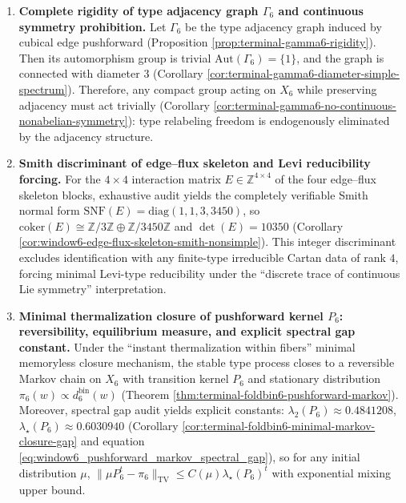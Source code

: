 \begin{enumerate}
  \item \textbf{Complete rigidity of type adjacency graph \texorpdfstring{$\Gamma_6$}{Gamma6} and continuous symmetry prohibition.}
  Let \(\Gamma_6\) be the type adjacency graph induced by cubical edge pushforward (Proposition \ref{prop:terminal-gamma6-rigidity}).
  Then its automorphism group is trivial \(\mathrm{Aut}(\Gamma_6)=\{1\}\), and the graph is connected with diameter \(3\) (Corollary \ref{cor:terminal-gamma6-diameter-simple-spectrum}).
  Therefore, any compact group acting on \(X_6\) while preserving adjacency must act trivially (Corollary \ref{cor:terminal-gamma6-no-continuous-nonabelian-symmetry}): type relabeling freedom is endogenously eliminated by the adjacency structure.

  \item \textbf{Smith discriminant of edge--flux skeleton and Levi reducibility forcing.}
  For the \(4\times4\) interaction matrix \(E\in\mathbb{Z}^{4\times4}\) of the four edge--flux skeleton blocks, exhaustive audit yields the completely verifiable Smith normal form
  \(
  \mathrm{SNF}(E)=\mathrm{diag}(1,1,3,3450)
  \), so \(\mathrm{coker}(E)\cong \mathbb{Z}/3\mathbb{Z}\oplus \mathbb{Z}/3450\mathbb{Z}\) and \(\det(E)=10350\) (Corollary \ref{cor:window6-edge-flux-skeleton-smith-nonsimple}).
  This integer discriminant excludes identification with any finite-type irreducible Cartan data of rank \(4\), forcing minimal Levi-type reducibility under the ``discrete trace of continuous Lie symmetry'' interpretation.

  \item \textbf{Minimal thermalization closure of pushforward kernel \texorpdfstring{$P_6$}{P6}: reversibility, equilibrium measure, and explicit spectral gap constant.}
  Under the ``instant thermalization within fibers'' minimal memoryless closure mechanism, the stable type process closes to a reversible Markov chain on \(X_6\) with transition kernel \(P_6\) and stationary distribution \(\pi_6(w)\propto d^{\mathrm{bin}}_6(w)\) (Theorem \ref{thm:terminal-foldbin6-pushforward-markov}).
  Moreover, spectral gap audit yields explicit constants: \(\lambda_2(P_6)\approx 0.4841208\), \(\lambda_\star(P_6)\approx 0.6030940\) (Corollary \ref{cor:terminal-foldbin6-minimal-markov-closure-gap} and equation \eqref{eq:window6_pushforward_markov_spectral_gap}), so for any initial distribution \(\mu\),
  \(
  \|\mu P_6^t-\pi_6\|_{\mathrm{TV}}\le C(\mu)\lambda_\star(P_6)^t
  \)
  with exponential mixing upper bound.


\end{enumerate}

